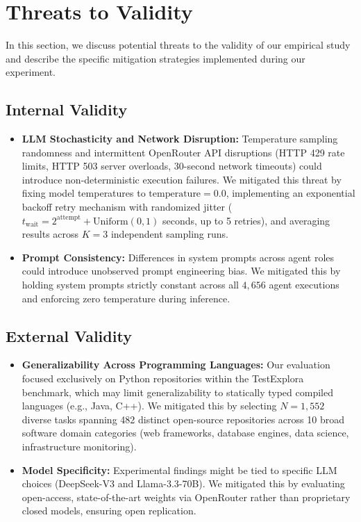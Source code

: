 \section{Threats to Validity}
\label{sec:threats}

In this section, we discuss potential threats to the validity of our empirical study and describe the specific mitigation strategies implemented during our experiment.

\subsection{Internal Validity}
\begin{itemize}
    \item \textbf{LLM Stochasticity and Network Disruption:} Temperature sampling randomness and intermittent OpenRouter API disruptions (HTTP 429 rate limits, HTTP 503 server overloads, 30-second network timeouts) could introduce non-deterministic execution failures. We mitigated this threat by fixing model temperatures to $\text{temperature}=0.0$, implementing an exponential backoff retry mechanism with randomized jitter ($t_{\text{wait}} = 2^{\text{attempt}} + \text{Uniform}(0, 1)$ seconds, up to 5 retries), and averaging results across $K=3$ independent sampling runs.
    \item \textbf{Prompt Consistency:} Differences in system prompts across agent roles could introduce unobserved prompt engineering bias. We mitigated this by holding system prompts strictly constant across all $4,656$ agent executions and enforcing zero temperature during inference.
\end{itemize}

\subsection{External Validity}
\begin{itemize}
    \item \textbf{Generalizability Across Programming Languages:} Our evaluation focused exclusively on Python repositories within the TestExplora benchmark, which may limit generalizability to statically typed compiled languages (e.g., Java, C++). We mitigated this by selecting $N=1,552$ diverse tasks spanning 482 distinct open-source repositories across 10 broad software domain categories (web frameworks, database engines, data science, infrastructure monitoring).
    \item \textbf{Model Specificity:} Experimental findings might be tied to specific LLM choices (DeepSeek-V3 and Llama-3.3-70B). We mitigated this by evaluating open-access, state-of-the-art weights via OpenRouter rather than proprietary closed models, ensuring open replication.
\end{itemize}

